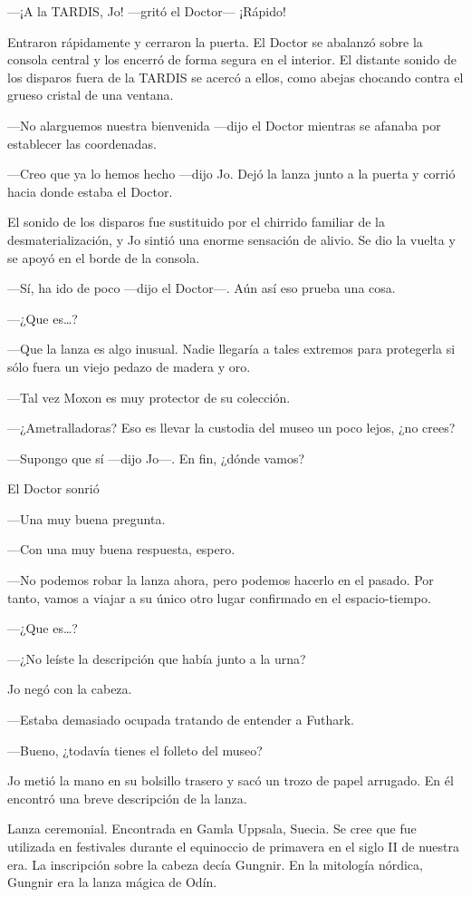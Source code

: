 ---¡A la TARDIS, Jo! ---gritó el Doctor--- ¡Rápido!

Entraron rápidamente y cerraron la puerta. El Doctor se abalanzó sobre
la consola central y los encerró de forma segura en el interior. El
distante sonido de los disparos fuera de la TARDIS se acercó a ellos,
como abejas chocando contra el grueso cristal de una ventana.

---No alarguemos nuestra bienvenida ---dijo el Doctor mientras se
afanaba por establecer las coordenadas.

---Creo que ya lo hemos hecho ---dijo Jo. Dejó la lanza junto a la
puerta y corrió hacia donde estaba el Doctor.

El sonido de los disparos fue sustituido por el chirrido familiar de la
desmaterialización, y Jo sintió una enorme sensación de alivio. Se dio
la vuelta y se apoyó en el borde de la consola.

---Sí, ha ido de poco ---dijo el Doctor---. Aún así eso prueba una cosa.

---¿Que es\ldots{}?

---Que la lanza es algo inusual. Nadie llegaría a tales extremos para
protegerla si sólo fuera un viejo pedazo de madera y oro.

---Tal vez Moxon es muy protector de su colección.

---¿Ametralladoras? Eso es llevar la custodia del museo un poco lejos,
¿no crees?

---Supongo que sí ---dijo Jo---. En fin, ¿dónde vamos?

El Doctor sonrió

---Una muy buena pregunta.

---Con una muy buena respuesta, espero.

---No podemos robar la lanza ahora, pero podemos hacerlo en el pasado.
Por tanto, vamos a viajar a su único otro lugar confirmado en el
espacio-tiempo.

---¿Que es\ldots{}?

---¿No leíste la descripción que había junto a la urna?

Jo negó con la cabeza.

---Estaba demasiado ocupada tratando de entender a Futhark.

---Bueno, ¿todavía tienes el folleto del museo?

Jo metió la mano en su bolsillo trasero y sacó un trozo de papel
arrugado. En él encontró una breve descripción de la lanza.

Lanza ceremonial. Encontrada en Gamla Uppsala, Suecia. Se cree que fue
utilizada en festivales durante el equinoccio de primavera en el siglo
II de nuestra era. La inscripción sobre la cabeza decía Gungnir. En la
mitología nórdica, Gungnir era la lanza mágica de Odín.

